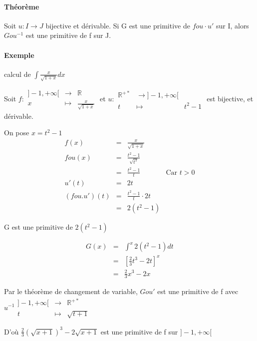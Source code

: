 \paragraph{Théorème} Soit $u:I \rightarrow J$ bijective et dérivable. Si G est une primitive de $fou\cdot u'$ sur I, alors $Gou^{-1}$ est une primitive de f sur J.

\paragraph{Exemple} calcul de $\int\frac{x}{\sqrt{1+x}}dx$

Soit $f:\begin{array}{rcl}
 ]-1, +\infty[ &\rightarrow& \mathbb{R} \\
x &\mapsto& \frac{x}{\sqrt{1+x}}\end{array}$
et $u : \begin{array}{rcl}
\mathbb{R}^{+*} & \rightarrow ]-1, +\infty[ \\
t &\mapsto& t^2 -1\end{array}$ est bijective, et dérivable.

On pose $x = t^2 - 1$ \[\begin{array}{rclr}
	f(x) &=& \frac{x}{\sqrt{1+x}} \\
	fou(x) &=& \frac{t^2 - 1}{\sqrt{t^2}} \\
		&=& \frac{t^2 - 1}{t} & \text{Car } t > 0 \\
	u'(t) &=& 2t \\
(fou.u')(t) &=& \frac{t^2 -1}{t}\cdot 2t \\
			&=& 2(t^2-1)
\end{array}\]

G est une primitive de $2(t^2 - 1)$ 

\[\begin{array}{rcl}
	G(x) &=& \int^x 2(t^2-1)dt \\
&=& [\frac{2}{3}t^3 - 2t]^x \\
&=& \frac{2}{3}x^3 - 2x\end{array}\]

Par le théorème de changement de variable, $Gou'$ est une primitive de f avec $u^{-1} \begin{array}{rcl}
																						]-1, +\infty[ &\rightarrow& \mathbb{R}^{+*} \\
																									t &\mapsto& \sqrt{t+1}\end{array}$

D'où $\frac{2}{3}(\sqrt{x+1})^3 - 2\sqrt{x+1}$ est une primitive de f sur $]-1, +\infty[$

